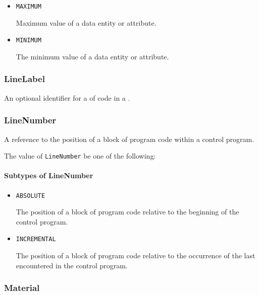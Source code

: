 \begin{itemize}

\item \texttt{MAXIMUM}


Maximum value of a data entity or attribute.

\item \texttt{MINIMUM}


The minimum value of a data entity or attribute.


\end{itemize}

\subsubsection{LineLabel}
\label{sec:LineLabel}



An optional identifier for a  of code in a .


\subsubsection{LineNumber}
\label{sec:LineNumber}



A reference to the position of a block of program code within a control program.


The value of \texttt{LineNumber} \MUST be one of the following: 

\FloatBarrier

\paragraph{Subtypes of LineNumber}\mbox{}
\label{sec:Subtypes of LineNumber}

\begin{itemize}

\item \texttt{ABSOLUTE}


The position of a block of program code relative to the beginning of the control program.

\item \texttt{INCREMENTAL}


The position of a block of program code relative to the occurrence of the last  encountered in the control program.


\end{itemize}

\subsubsection{Material}
\label{sec:Material}



